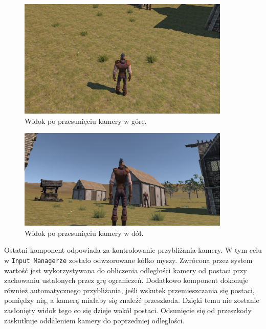 \begin{figure}[h!]
    \centering
    \includegraphics[width=0.9\textwidth]{images/implementacja/poruszanie_postacią/widok_z_gory.jpg}
    \caption{Widok po przesunięciu kamery w górę.}\label{fig:gora}
\end{figure}

\begin{figure}[h!]
    \centering
    \includegraphics[width=0.9\textwidth]{images/implementacja/poruszanie_postacią/widok_z_dolu.jpg}
    \caption{Widok po przesunięciu kamery w dół.}\label{fig:dol}
\end{figure}

Ostatni komponent odpowiada za kontrolowanie przybliżania kamery. W tym celu w \texttt{Input Managerze} zostało odwzorowane kółko
myszy. Zwrócona przez system wartość jest wykorzystywana do obliczenia odległości kamery od postaci przy zachowaniu
ustalonych przez grę ograniczeń. Dodatkowo komponent dokonuje również automatycznego przybliżania, jeśli wskutek
przemieszczania się postaci, pomiędzy nią, a kamerą miałaby się znaleźć przeszkoda. Dzięki temu nie zostanie zasłonięty
widok tego co się dzieje wokół postaci. Odsunięcie się od przeszkody zaskutkuje oddaleniem kamery do poprzedniej
odległości.
